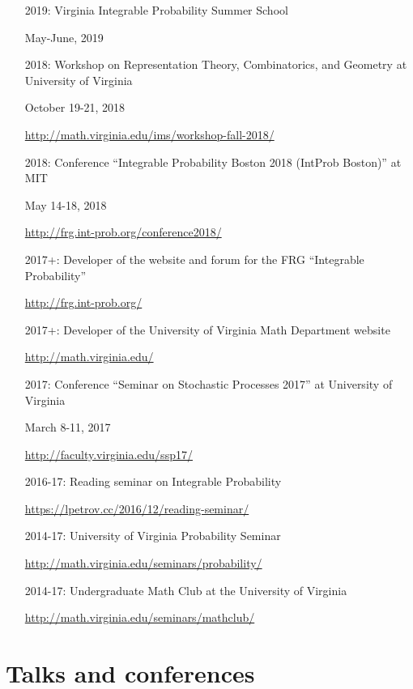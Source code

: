 \documentclass[letterpaper,11pt]{article}
\begin{document}
\begin{itemize}
	\item [2019:]
		Virginia Integrable Probability Summer School
		
		May-June, 2019
		
	\item [2018:]
		Workshop on Representation Theory, Combinatorics, and Geometry
		at University of
		Virginia
		
		October 19-21, 2018
	
		\url{http://math.virginia.edu/ims/workshop-fall-2018/}

	\item [2018:]
		Conference 
		``Integrable Probability Boston 2018 (IntProb Boston)''
		at MIT

		May 14-18, 2018
	
		\url{http://frg.int-prob.org/conference2018/}


	\item [2017+:]
		Developer of the website and forum for the FRG ``Integrable Probability''

		\url{http://frg.int-prob.org/}

	\item [2017+:]
		Developer of the University of Virginia Math Department website

		\url{http://math.virginia.edu/}
	\item
	      [2017:] Conference
	      ``Seminar on Stochastic Processes 2017'' at University of
		Virginia
		
		March 8-11, 2017

	      \url{http://faculty.virginia.edu/ssp17/}
	\item
	      [2016-17:]
	      Reading seminar on Integrable Probability

	      \url{https://lpetrov.cc/2016/12/reading-seminar/}
	\item
	      [2014-17:] University of Virginia Probability Seminar

	      \url{http://math.virginia.edu/seminars/probability/}
	\item
	      [2014-17:]
	      Undergraduate Math Club at the University of Virginia

	      \url{http://math.virginia.edu/seminars/mathclub/}
\end{itemize}

\section*{Talks and conferences}
\end{document}
